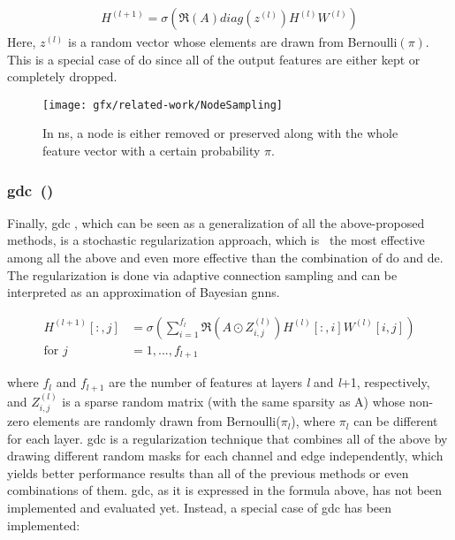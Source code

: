 \begin{align*}
    H^{(l+1)} = \sigma (\mathfrak{R}(A) diag(z^{(l)}) H^{(l)} W^{(l)})
\end{align*}
Here, $z^{(l)}$ is a random vector whose elements are drawn from Bernoulli$(\pi)$.
This is a special case of \ac{do} since all of the output features are either kept or completely dropped.
\begin{figure}[ht]
    \centering
    \texttt{[image: gfx/related-work/NodeSampling]}
    \caption{In \acf{ns}, a node is either removed or preserved along with the whole feature
        vector with a certain probability $\pi$.}\label{fig:related:NodeSampling}
\end{figure}
\subsubsection{\acl*{gdc}~(\citeauthor{Hasanzadeh2020})}
\label{sec:related:pred:regularization:gdc}
Finally, \ac{gdc} \cite{Hasanzadeh2020}, which can be seen as a generalization of all the above-proposed methods, is a stochastic regularization approach, which is~\cite{Hasanzadeh2020} the most effective among all the above and even more effective than the combination of \ac{do} and \ac{de}.
The regularization is done via adaptive connection sampling and can be interpreted as an approximation of Bayesian \acp{gnn}.

\begin{align}
    H^{(l+1)}[:,j] & = \sigma \left(\sum_{i=1}^{f_{l}}\mathfrak{R}\left(A \odot Z_{i,j}^{(l)}\right)H^{(l)}[:,i]W^{(l)}[i,j]\right) \\
    \text{for } j  & = 1,..., f_{l+1}
    \label{eq:related:gdc-hard}
\end{align}

where $f_{l}$ and $f_{l+1}$ are the number of features at layers \textit{l} and \textit{l}+1, respectively, and
$Z_{i,j}^{(l)}$ is a sparse random matrix (with the same sparsity as A) whose non-zero
elements are randomly drawn from Bernoulli($\pi_{l}$), where $\pi_{l}$ can be different for each layer.
\Ac{gdc} is a regularization technique that combines all of the above by drawing different random masks for each channel and edge independently, which yields better performance results than all of the previous methods or even combinations of them.
\Ac{gdc}, as it is expressed in the formula above, has not been implemented and evaluated yet. Instead, a special case of \ac{gdc} has been implemented:

